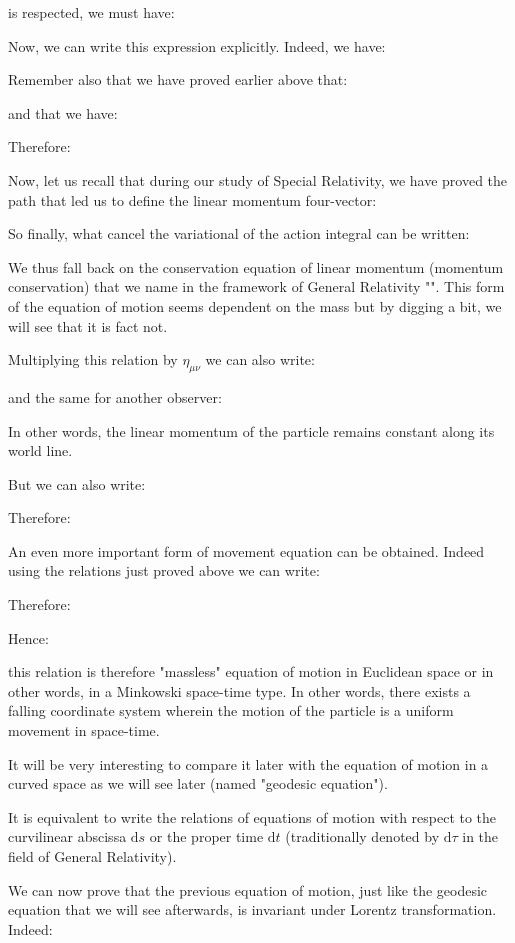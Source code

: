 	is respected, we must have:
	
	Now, we can write this expression explicitly. Indeed, we have:
	 
	Remember also that we have proved earlier above that:
	
	and that we have:
	
	Therefore:
	
	Now, let us recall that during our study of Special Relativity, we have proved the path that led us to define the linear momentum four-vector:
	
	So finally, what cancel the variational of the action integral can be written:
	
	We thus fall back on the conservation equation of linear momentum (momentum conservation) that we name in the framework of General Relativity "". This form of the equation of motion seems dependent on the mass but by digging a bit, we will see that it is fact not.
	
	Multiplying this relation by $\eta_{\mu\nu}$ we can also write:
	
	and the same for another observer:
	
	In other words, the linear momentum of the particle remains constant along its world line.

	But we can also write:
	
	Therefore:
	
	An even more important form of movement equation can be obtained. Indeed using the relations just proved above we can write:
	
	Therefore:
	
	Hence:
	
	this relation is therefore "massless" equation of motion in Euclidean space or in other words, in a Minkowski space-time type. In other words, there exists a falling coordinate system wherein the motion of the particle is a uniform movement in space-time.
	
	It will be very interesting to compare it later with the equation of motion in a curved space as we will see later (named "geodesic equation").
	\begin{tcolorbox}[title=Remark,colframe=black,arc=10pt]
	It is equivalent to write the relations of equations of motion with respect to the curvilinear abscissa $\mathrm{d}s$ or the proper time $\mathrm{d}t$ (traditionally denoted by $\mathrm{d}\tau$ in the field of General Relativity).
	\end{tcolorbox}
	We can now prove that the previous equation of motion, just like the geodesic equation that we will see afterwards, is invariant under Lorentz transformation. Indeed:
	
